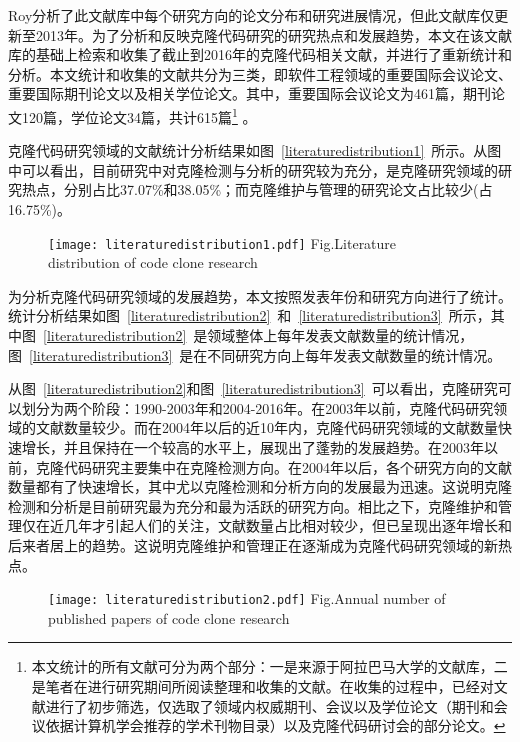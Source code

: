 Roy分析了此文献库中每个研究方向的论文分布和研究进展情况\cite{roy2014vision}，但此文献库仅更新至2013年。为了分析和反映克隆代码研究的研究热点和发展趋势，本文在该文献库的基础上检索和收集了截止到2016年的克隆代码相关文献，并进行了重新统计和分析。本文统计和收集的文献共分为三类，即软件工程领域的重要国际会议论文、重要国际期刊论文以及相关学位论文。其中，重要国际会议论文为461篇，期刊论文120篇，学位论文34篇，共计615篇\footnote{本文统计的所有文献可分为两个部分：一是来源于阿拉巴马大学的文献库，二是笔者在进行研究期间所阅读整理和收集的文献。在收集的过程中，已经对文献进行了初步筛选，仅选取了领域内权威期刊、会议以及学位论文（期刊和会议依据计算机学会推荐的学术刊物目录）以及克隆代码研讨会的部分论文。} 。

克隆代码研究领域的文献统计分析结果如图~\ref{literaturedistribution1}~所示。从图中可以看出，目前研究中对克隆检测与分析的研究较为充分，是克隆研究领域的研究热点，分别占比37.07\%和38.05\%；而克隆维护与管理的研究论文占比较少(占16.75\%)。

\begin{figure}[htbp]
\centering
\texttt{[image: literaturedistribution1.pdf]}
{Fig.$\!$}{Literature distribution of code clone research}
\vspace{-1em}
\end{figure}

为分析克隆代码研究领域的发展趋势，本文按照发表年份和研究方向进行了统计。统计分析结果如图~\ref{literaturedistribution2}~和~\ref{literaturedistribution3}~所示，其中图~\ref{literaturedistribution2}~是领域整体上每年发表文献数量的统计情况，图~\ref{literaturedistribution3}~是在不同研究方向上每年发表文献数量的统计情况。

从图~\ref{literaturedistribution2}和图~\ref{literaturedistribution3}~可以看出，克隆研究可以划分为两个阶段：1990-2003年和2004-2016年。在2003年以前，克隆代码研究领域的文献数量较少。而在2004年以后的近10年内，克隆代码研究领域的文献数量快速增长，并且保持在一个较高的水平上，展现出了蓬勃的发展趋势。在2003年以前，克隆代码研究主要集中在克隆检测方向。在2004年以后，各个研究方向的文献数量都有了快速增长，其中尤以克隆检测和分析方向的发展最为迅速。这说明克隆检测和分析是目前研究最为充分和最为活跃的研究方向。相比之下，克隆维护和管理仅在近几年才引起人们的关注，文献数量占比相对较少，但已呈现出逐年增长和后来者居上的趋势。这说明克隆维护和管理正在逐渐成为克隆代码研究领域的新热点。

\begin{figure}[htbp]
\centering
\texttt{[image: literaturedistribution2.pdf]}
{Fig.$\!$}{Annual number of published papers of code clone research}
\vspace{-1em}
\end{figure}


